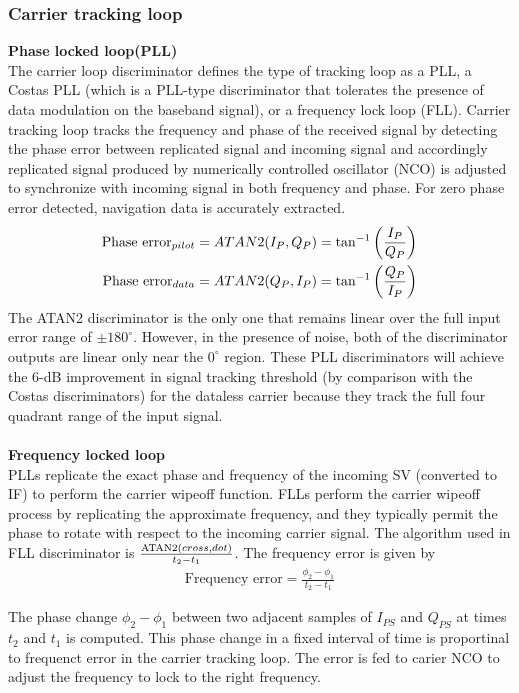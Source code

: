 \subsubsection{Carrier tracking loop}
\textbf{Phase locked loop(PLL)}\\
The carrier loop discriminator defines the type of tracking loop as a PLL, a Costas PLL (which is a PLL-type discriminator that tolerates the presence of data modulation on the baseband signal), or a frequency lock loop (FLL). Carrier tracking loop tracks the frequency and phase of the received signal by detecting the phase error between replicated signal and incoming signal and accordingly replicated signal produced by numerically controlled oscillator (NCO) is adjusted to synchronize with incoming signal in both frequency and phase. For zero phase error detected, navigation data is accurately extracted. 
\begin{align}
  \text{Phase error}_{pilot} &=ATAN2(I_P,Q_P) = \tan^{-1}\left(\frac{I_P}{Q_P}\right)\\
  \text{Phase error}_{data} &=ATAN2(Q_P,I_P) = \tan^{-1}\left(\frac{Q_P}{I_P}\right)
\end{align}
The ATAN2 discriminator is the only one that remains linear over the full input error range of $\pm180^{\circ}$. However, in the presence of noise, both of the discriminator outputs are linear only near the $0^{\circ}$ region. These PLL discriminators will achieve the 6-dB improvement in signal tracking threshold (by comparison with the Costas discriminators) for the dataless carrier because they track the full four quadrant range of the input signal.
\\
\\
\textbf{Frequency locked loop}\\
PLLs replicate the exact phase and frequency of the incoming SV (converted to IF) to perform the carrier wipeoff function. FLLs perform the carrier wipeoff process by replicating the approximate frequency, and they typically permit the phase to rotate with respect to the incoming carrier signal. The algorithm used in FLL discriminator is $\frac{\text{ATAN2}{\ensuremath{\left(cross,dot\right)}}}{t_2-t_1}$. The frequency error is given by 
\begin{align}
	\text{Frequency error} = \frac{\phi_2-\phi_1}{t_2-t_1}
\end{align}

\noindent The phase change $\phi_2 - \phi_1$ between two adjacent samples of $I_{PS}$ and $Q_{PS}$ at times $t_2$ and $t_1$ is computed. This phase change in a fixed interval of time is proportinal to frequenct error in the carrier tracking loop. The error is fed to carier NCO to adjust the frequency to lock to the right frequency.

